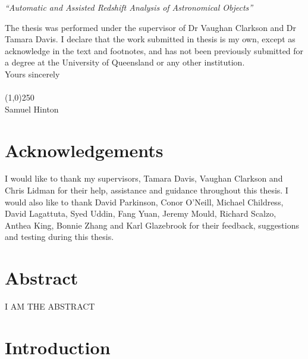 \documentclass[titlesmallcaps, examinerscopy, copyrightpage]{uqthesis}
\begin{document}
\begin{center}
  \emph{``Automatic and Assisted Redshift Analysis of Astronomical Objects''}
\end{center}

\noindent The thesis was performed under the supervisor of Dr Vaughan Clarkson and Dr Tamara Davis. I declare that the work
submitted in thesis is my own, except as acknowledge in the text and footnotes, and has not been
previously submitted for a degree at the University of Queensland or any other institution. \\

\noindent Yours sincerely \\ \\ 

\noindent \line(1,0){250} \\

\noindent Samuel Hinton


\chapter{Acknowledgements}

I would like to thank my supervisors, Tamara Davis, Vaughan Clarkson and Chris Lidman for their help, assistance and guidance throughout this thesis. I would also like to thank David Parkinson, Conor O'Neill, Michael Childress, David Lagattuta, Syed Uddin, Fang Yuan, Jeremy Mould, Richard Scalzo, Anthea King, Bonnie Zhang and Karl Glazebrook for their feedback, suggestions and testing during this thesis.


\chapter{Abstract}

I AM THE ABSTRACT


\cleardoublepage
\hypersetup{pageanchor=true}

\tableofcontents
\listoffigures
\listoftables


\mainmatter


\chapter{Introduction}
\end{document}

